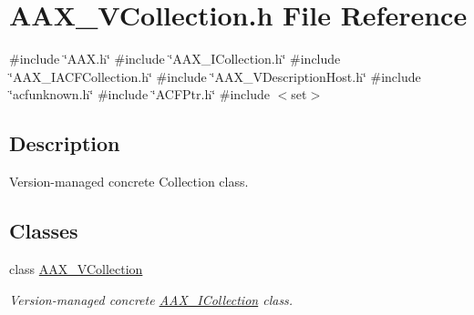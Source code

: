 \hypertarget{a00692}{}\section{A\+A\+X\+\_\+\+V\+Collection.\+h File Reference}
\label{a00692}
{\ttfamily \#include \char`\"{}A\+A\+X.\+h\char`\"{}}\newline
{\ttfamily \#include \char`\"{}A\+A\+X\+\_\+\+I\+Collection.\+h\char`\"{}}\newline
{\ttfamily \#include \char`\"{}A\+A\+X\+\_\+\+I\+A\+C\+F\+Collection.\+h\char`\"{}}\newline
{\ttfamily \#include \char`\"{}A\+A\+X\+\_\+\+V\+Description\+Host.\+h\char`\"{}}\newline
{\ttfamily \#include \char`\"{}acfunknown.\+h\char`\"{}}\newline
{\ttfamily \#include \char`\"{}A\+C\+F\+Ptr.\+h\char`\"{}}\newline
{\ttfamily \#include $<$set$>$}\newline


\subsection{Description}
Version-\/managed concrete Collection class. 

\subsection*{Classes}
\begin{DoxyCompactItemize}
\item 
class \mbox{\hyperlink{a01897}{A\+A\+X\+\_\+\+V\+Collection}}
\begin{DoxyCompactList}\small\item\em Version-\/managed concrete \mbox{\hyperlink{a01777}{A\+A\+X\+\_\+\+I\+Collection}} class. \end{DoxyCompactList}\end{DoxyCompactItemize}
